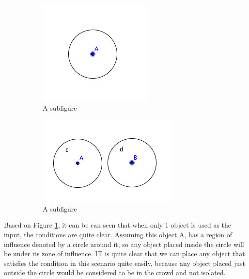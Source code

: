 \documentclass[a4paper,11pt]{article}
\begin{document}
\begin{figure}[h]
\centering
\begin{subfigure}{.4\textwidth}
  \centering
  \includegraphics[width=.4\linewidth]{1OOI}
  \caption{A subfigure}
  \label{fig:1OOI}
\end{subfigure}%
\begin{subfigure}{.4\textwidth}
  \centering
  \includegraphics[width=.4\linewidth]{2OOI}
  \caption{A subfigure}
  \label{fig:2OOI}
\end{subfigure}
\caption{}
\label{fig:Condition}
\end{figure}

Based on Figure \ref{fig:1OOI}, it can be can seen that when only 1 object is used as the input, the conditions are quite clear. Assuming this object A, has a region of influence denoted by a circle around it, so any object placed inside the circle will be under its zone of influence. IT is quite clear that we can place any object that satisfies the condition in this scenario quite easily, because any object placed just outside the circle would be considered to be in the crowd and not isolated. 
\end{document}

